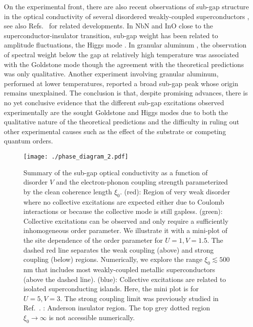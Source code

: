 \documentclass[Collective.tex]{revtex4-1}
\begin{document}
%
On the experimental front, there are also recent observations of sub-gap structure in the optical conductivity of several disordered weakly-coupled superconductors \cite{crane2007,Driessen2012,sherman2015,neilinger2015,pracht2016}, see also Refs.~\cite{Mondal2011,Chand2012,Mondal2013,cheng2016,Orr1985,Jaeger1989,goldman1993,thiemann2018,graybeal1984,shahar1992} for related developments. In NbN and InO \cite{sherman2015,matsunaga2014} close to the superconductor-insulator transition, sub-gap weight has been related to amplitude fluctuations, the Higgs mode \cite{shimano2020}. In granular aluminum \cite{pracht2017}, the observation of spectral weight below the gap at relatively high temperature was associated with the Goldstone mode though the agreement with the theoretical predictions was only qualitative. Another experiment \cite{levy2019} involving granular aluminum, performed at lower temperatures, reported a broad sub-gap peak whose origin remains unexplained. The conclusion is that, despite promising advances, there is no yet conclusive evidence that the different sub-gap excitations observed experimentally are the sought Goldstone and Higgs modes due to both the qualitative nature of the theoretical predictions and the difficulty in ruling out other experimental causes such as the effect of the substrate or competing quantum orders.
\begin{figure}
		\texttt{[image: ./phase\_diagram\_2.pdf]}
		\caption{Summary of the sub-gap optical conductivity as a function of disorder $V$ and the electron-phonon coupling strength parameterized by the clean coherence length $\xi_0$. %
			\uppercase\expandafter{} (red): Region of very weak disorder where no collective excitations are expected either due to Coulomb interactions or because the collective mode is still gapless. \uppercase\expandafter{} (green): Collective excitations can be observed and only require a sufficiently inhomogeneous order parameter. We illustrate it with a mini-plot of the site dependence of the order parameter for $U=1, V=1.5$. The dashed red line separates the weak coupling (above) and strong coupling (below) regions. Numerically, we explore the range $\xi_0 \lesssim 500$nm that includes most weakly-coupled metallic superconductors (above the dashed line).  %
			\uppercase\expandafter{} (blue): Collective excitations are related to isolated superconducting islands. Here, the mini plot is for $U=5, V=3$. The strong coupling limit was previously studied in  Ref.~\cite{cea2014}.  \uppercase\expandafter{}: Anderson insulator region. The top grey dotted region $\xi_0 \rightarrow \infty$ is not accessible numerically.} \label{Fig.phase_diagram}
\end{figure}
\end{document}
